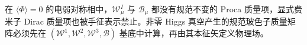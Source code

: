 

在 $\langle\Phi\rangle=0$ 的电弱对称相中，$\mathcal W_\mu^I$ 与 $\mathcal B_\mu$ 都没有规范不变的 Proca 质量项，显式费米子 Dirac 质量项也被手征表示禁止。非零 Higgs 真空产生的规范玻色子质量矩阵必须先在 $(\mathcal W^1,\mathcal W^2,\mathcal W^3,\mathcal B)$ 基底中计算，再由其本征矢定义物理场。



